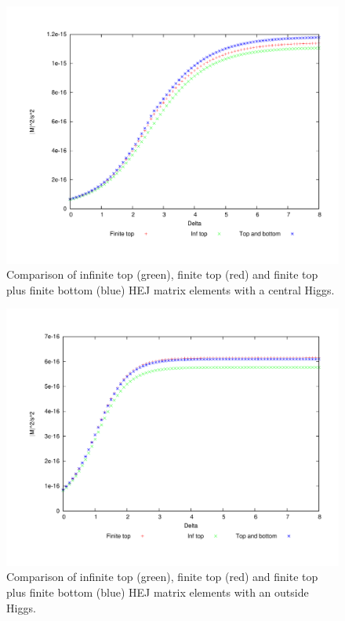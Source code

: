 \begin{figure}[t]
\centering
\includegraphics[scale=0.45]{Images/qg_qgH_compare_central.pdf}
\caption{Comparison of infinite top (green), finite top (red) and finite top plus finite bottom (blue) HEJ matrix elements with a central Higgs.}
\label{fig:qg_qgh_compare}
\end{figure}

\begin{figure}[t]
\centering
\includegraphics[scale=0.45]{Images/qg_qgH_compare_outside.pdf}
\caption{Comparison of infinite top (green), finite top (red) and finite top plus finite bottom (blue) HEJ matrix elements with an outside Higgs.}
\label{fig:qg_qgh_compare_out}
\end{figure}

